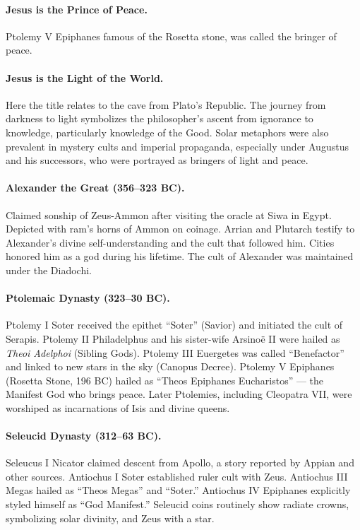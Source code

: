 \paragraph{Jesus is the Prince of Peace.}\label{par:jesus-is-the-prince-of-peace.}
Ptolemy V Epiphanes famous of the Rosetta stone, was called the bringer of peace.

\paragraph{Jesus is the Light of the World.}\label{par:jesus-is-the-light-of-the-world.}
Here the title relates to the cave from Plato’s Republic.
The journey from darkness to light symbolizes the philosopher’s ascent from ignorance to knowledge, particularly knowledge of the Good. Solar metaphors were also prevalent in mystery cults and imperial propaganda, especially under Augustus and his successors, who were portrayed as bringers of light and peace.

\paragraph{Alexander the Great (356–323 BC).}
Claimed sonship of Zeus-Ammon after visiting the oracle at Siwa in Egypt.
Depicted with ram’s horns of Ammon on coinage.
Arrian and Plutarch testify to Alexander’s divine self-understanding and the cult that followed him.
Cities honored him as a god during his lifetime.
The cult of Alexander was maintained under the Diadochi.

\paragraph{Ptolemaic Dynasty (323–30 BC).}
Ptolemy I Soter received the epithet “Soter” (Savior) and initiated the cult of Serapis.
Ptolemy II Philadelphus and his sister-wife Arsinoë II were hailed as \textit{Theoi Adelphoi} (Sibling Gods).
Ptolemy III Euergetes was called “Benefactor” and linked to new stars in the sky (Canopus Decree).
Ptolemy V Epiphanes (Rosetta Stone, 196 BC) hailed as “Theos Epiphanes Eucharistos” — the Manifest God who brings peace.
Later Ptolemies, including Cleopatra VII, were worshiped as incarnations of Isis and divine queens.

\paragraph{Seleucid Dynasty (312–63 BC).}
Seleucus I Nicator claimed descent from Apollo, a story reported by Appian and other sources.
Antiochus I Soter established ruler cult with Zeus.
Antiochus III Megas hailed as “Theos Megas” and “Soter.”
Antiochus IV Epiphanes explicitly styled himself as “God Manifest.”
Seleucid coins routinely show radiate crowns, symbolizing solar divinity, and Zeus with a star.

